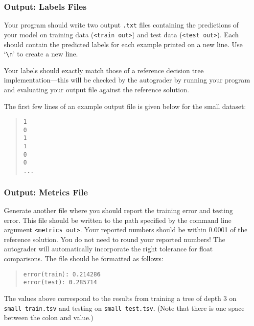 \documentclass[11pt,addpoints,answers]{exam}
\begin{document}
\subsubsection{Output: Labels Files}
\label{sec:labels}

Your program should write two output \lstinline{.txt} files containing the predictions of your model on training data (\lstinline{<train out>}) and test data (\lstinline{<test out>}). Each should contain the predicted labels for each example printed on a new line. Use `\texttt{\textbackslash n}' to create a new line.

Your labels should exactly match those of a reference decision tree implementation---this will be checked by the autograder by running your program and evaluating your output file against the reference solution.

%
The first few lines of an example output file is given below for the small dataset:
\begin{quote}
\begin{verbatim}
1
0
1
1
0
0
...
\end{verbatim}
\end{quote}

\subsubsection{Output: Metrics File}
\label{sec:metrics}

Generate another file where you should report the training error and testing error. This file should be written to the path specified by the command line argument \lstinline{<metrics out>}. Your reported numbers should be within 0.0001 of the reference solution. You do not need to round your reported numbers! The autograder will automatically incorporate the right tolerance for float comparisons. The file should be formatted as follows:

\begin{quote}
\begin{verbatim}
error(train): 0.214286
error(test): 0.285714
\end{verbatim}
\end{quote}

The values above correspond to the results from training a tree of depth 3 on \texttt{small\_train.tsv} and testing on \texttt{small\_test.tsv}. (Note that there is one space between the colon and value.)
\end{document}
